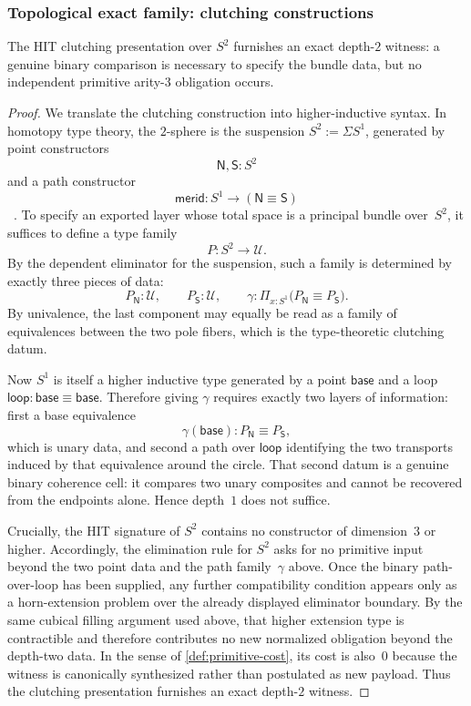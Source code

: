 \documentclass{lmcs}
\newcommand{\U}{\mathcal{U}}
\begin{document}
\subsubsection{Topological exact family: clutching constructions}

\begin{thm}
\label{thm:clutching}
The HIT clutching presentation over $S^2$ furnishes an exact depth-$2$ witness: a genuine binary comparison is necessary to specify the bundle data, but no independent primitive arity-$3$ obligation occurs.
\end{thm}

\begin{proof}
We translate the clutching construction into higher-inductive syntax. In homotopy type theory, the $2$-sphere is the suspension $S^2 := \Sigma S^1$, generated by point constructors
\[
  \mathsf{N}, \mathsf{S} : S^2
\]
and a path constructor
\[
  \mathsf{merid} : S^1 \to (\mathsf{N} \equiv \mathsf{S})
\]
~\cite{hott,cchm-hits}. To specify an exported layer whose total space is a principal bundle over~$S^2$, it suffices to define a type family
\[
  P : S^2 \to \U.
\]
By the dependent eliminator for the suspension, such a family is determined by exactly three pieces of data:
\[
  P_{\mathsf{N}} : \U,
  \qquad
  P_{\mathsf{S}} : \U,
  \qquad
  \gamma : \Pi_{x:S^1} \bigl(P_{\mathsf{N}} \equiv P_{\mathsf{S}}\bigr).
\]
By univalence, the last component may equally be read as a family of equivalences between the two pole fibers, which is the type-theoretic clutching datum.

Now $S^1$ is itself a higher inductive type generated by a point $\mathsf{base}$ and a loop $\mathsf{loop} : \mathsf{base} \equiv \mathsf{base}$. Therefore giving $\gamma$ requires exactly two layers of information: first a base equivalence
\[
  \gamma(\mathsf{base}) : P_{\mathsf{N}} \equiv P_{\mathsf{S}},
\]
which is unary data, and second a path over $\mathsf{loop}$ identifying the two transports induced by that equivalence around the circle. That second datum is a genuine binary coherence cell: it compares two unary composites and cannot be recovered from the endpoints alone. Hence depth~$1$ does not suffice.

Crucially, the HIT signature of $S^2$ contains no constructor of dimension~$3$ or higher. Accordingly, the elimination rule for $S^2$ asks for no primitive input beyond the two point data and the path family~$\gamma$ above. Once the binary path-over-loop has been supplied, any further compatibility condition appears only as a horn-extension problem over the already displayed eliminator boundary. By the same cubical filling argument used above, that higher extension type is contractible and therefore contributes no new normalized obligation beyond the depth-two data. In the sense of \autoref{def:primitive-cost}, its cost is also~$0$ because the witness is canonically synthesized rather than postulated as new payload. Thus the clutching presentation furnishes an exact depth-$2$ witness.
\end{proof}
\end{document}
